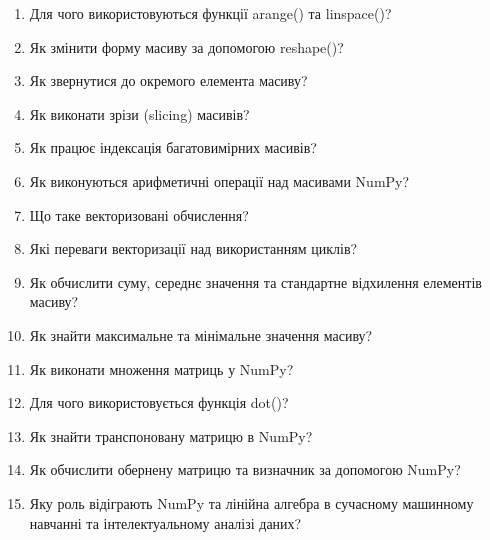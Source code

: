 \begin{enumerate}
\item Для чого використовуються функції arange() та linspace()?
\item Як змінити форму масиву за допомогою reshape()?
\item Як звернутися до окремого елемента масиву?
\item Як виконати зрізи (slicing) масивів?
\item Як працює індексація багатовимірних масивів?
\item Як виконуються арифметичні операції над масивами NumPy?
\item Що таке векторизовані обчислення?
\item Які переваги векторизації над використанням циклів?
\item Як обчислити суму, середнє значення та стандартне відхилення елементів масиву?
\item Як знайти максимальне та мінімальне значення масиву?
\item Як виконати множення матриць у NumPy?
\item Для чого використовується функція dot()?
\item Як знайти транспоновану матрицю в NumPy?
\item Як обчислити обернену матрицю та визначник за допомогою NumPy?
\item Яку роль відіграють NumPy та лінійна алгебра в сучасному машинному навчанні та інтелектуальному аналізі даних?
\end{enumerate}
